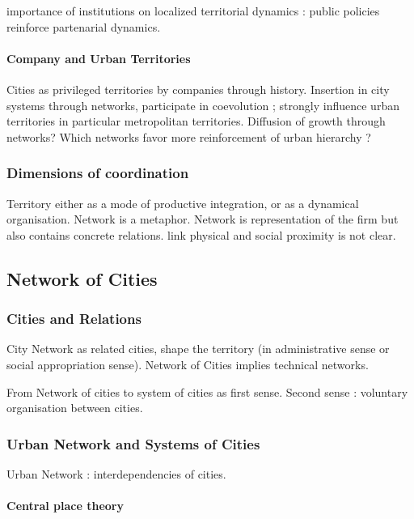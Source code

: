 importance of institutions on localized territorial dynamics : public policies reinforce partenarial dynamics.

\paragraph{Company and Urban Territories}

Cities as privileged territories by companies through history. Insertion in city systems through networks, participate in coevolution ; strongly influence urban territories in particular metropolitan territories. Diffusion of growth through networks? Which networks favor more reinforcement of urban hierarchy ?

\subsubsection*{Dimensions of coordination}

Territory either as a mode of productive integration, or as a dynamical organisation. Network is a metaphor. Network is representation of the firm but also contains concrete relations. link physical and social proximity is not clear.


\subsection{Network of Cities}

\subsubsection*{Cities and Relations}

City Network as related cities, shape the territory (in administrative sense or social appropriation sense). Network of Cities implies technical networks.

From Network of cities to system of cities as first sense. Second sense : voluntary organisation between cities.

\subsubsection*{Urban Network and Systems of Cities}

Urban Network : interdependencies of cities.

\paragraph{Central place theory}


